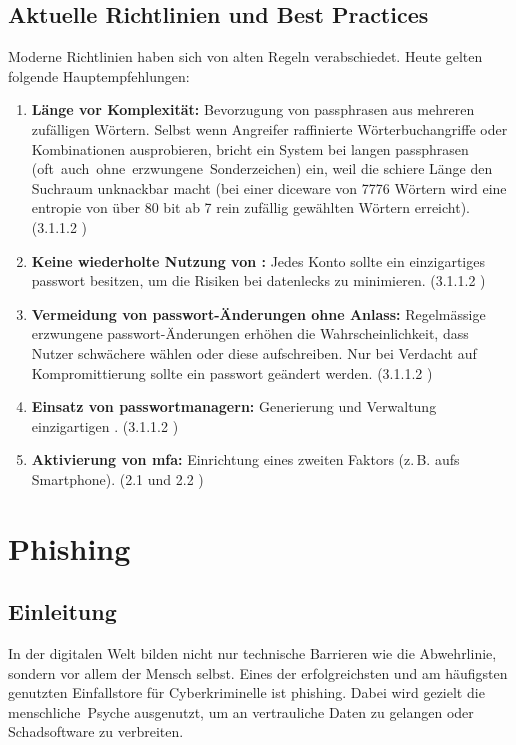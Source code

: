 \documentclass[12pt,a4paper]{article}
\begin{document}
\subsection{Aktuelle Richtlinien und Best Practices}
Moderne Richtlinien haben sich von alten Regeln verabschiedet. Heute gelten folgende Hauptempfehlungen:
\begin{enumerate}
    \item \textbf{Länge vor Komplexität:} Bevorzugung von \gls{passphrase}n aus mehreren \mbox{zufälligen} Wörtern. Selbst wenn Angreifer raffinierte Wörterbuchangriffe oder Kombinationen ausprobieren, bricht ein System bei langen \gls{passphrase}n \mbox{(oft auch ohne erzwungene Sonderzeichen)} ein, weil die schiere Länge den Suchraum unknackbar macht (bei einer \gls{diceware} von 7776 Wörtern wird eine \\ \gls{entropie} von über 80 \gls{bit} ab 7 rein zufällig gewählten Wörtern erreicht). (3.1.1.2 \cite{nist2025})
    \item \textbf{Keine wiederholte Nutzung von :} Jedes Konto sollte ein \mbox{einzigartiges} \gls{passwort} besitzen, um die Risiken bei \gls{datenleck}s zu minimieren. (3.1.1.2 \cite{nist2025})
    \item \textbf{Vermeidung von \gls{passwort}-Änderungen ohne Anlass:} Regelmässige \mbox{erzwungene} \gls{passwort}-Änderungen erhöhen die Wahrscheinlichkeit, dass Nutzer schwächere  wählen oder diese aufschreiben. Nur bei Verdacht auf Kompromittierung sollte ein \gls{passwort} geändert werden.   (3.1.1.2 \cite{nist2025})
    \item \textbf{Einsatz von \gls{passwortmanager}n:} Generierung und Verwaltung einzigartigen \mbox{}. (3.1.1.2 \cite{nist2025})
    \item \textbf{Aktivierung von \gls{mfa}:} Einrichtung eines zweiten Faktors (z.\,B. aufs \mbox{Smartphone}). (2.1 und 2.2 \cite{nist2025})
\end{enumerate}

\newpage
\section{Phishing}
\label{sec:phishing}

\subsection{Einleitung}
In der digitalen Welt bilden nicht nur technische Barrieren wie  die \mbox{Abwehrlinie}, sondern vor allem der Mensch selbst. Eines der erfolgreichsten und am \mbox{häufigsten} genutzten Einfallstore für Cyberkriminelle ist \gls{phishing}. Dabei wird gezielt die \mbox{menschliche Psyche} ausgenutzt, um an vertrauliche Daten zu gelangen oder \mbox{Schadsoftware} zu verbreiten.
\end{document}
